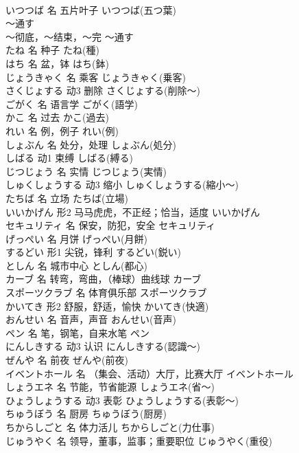 \documentclass[8pt]{extreport}
\begin{document}
\begin{CJK}{UTF8}{min}
\\	いつつば	名	五片叶子	いつつば(五つ葉)	
\\	～通す	
\\	～彻底，～结束，～完	～通す	
\\	たね	名	种子	たね(種)	
\\	はち	名	盆，钵	はち(鉢)	
\\	じょうきゃく	名	乘客	じょうきゃく(乗客)	
\\	さくじょする	动3	删除	さくじょする(削除～)	
\\	ごがく	名	语言学	ごがく(語学)	
\\	かこ	名	过去	かこ(過去)	
\\	れい	名	例，例子	れい(例)	
\\	しょぶん	名	处分，处理	しょぶん(処分)	
\\	しばる	动1	束缚	しばる(縛る)	
\\	じつじょう	名	实情	じつじょう(実情)	
\\	しゅくしょうする	动3	缩小	しゅくしょうする(縮小～)	
\\	たちば	名	立场	たちば(立場)	
\\	いいかげん	形2	马马虎虎，不正经；恰当，适度	いいかげん	
\\	セキュリティ	名	保安，防犯，安全	セキュリティ	
\\	げっぺい	名	月饼	げっぺい(月餅)	
\\	するどい	形1	尖锐，锋利	するどい(鋭い)	
\\	としん	名	城市中心	としん(都心)	
\\	カーブ	名	转弯，弯曲，（棒球）曲线球	カーブ	
\\	スポーツクラブ	名	体育俱乐部	スポーツクラブ	
\\	かいてき	形2	舒服，舒适，愉快	かいてき(快適)	
\\	おんせい	名	音声，声音	おんせい(音声)	
\\	ペン	名	笔，钢笔，自来水笔	ペン	
\\	にんしきする	动3	认识	にんしきする(認識～)	
\\	ぜんや	名	前夜	ぜんや(前夜)	
\\	イベントホール	名	（集会、活动）大厅，比赛大厅	イベントホール	
\\	しょうエネ	名	节能，节省能源	しょうエネ(省～)	
\\	ひょうしょうする	动3	表彰	ひょうしょうする(表彰～)	
\\	ちゅうぼう	名	厨房	ちゅうぼう(厨房)	
\\	ちからしごと	名	体力活儿	ちからしごと(力仕事)	
\\	じゅうやく	名	领导，董事，监事；重要职位	じゅうやく(重役)	

\end{CJK}
\end{document}
